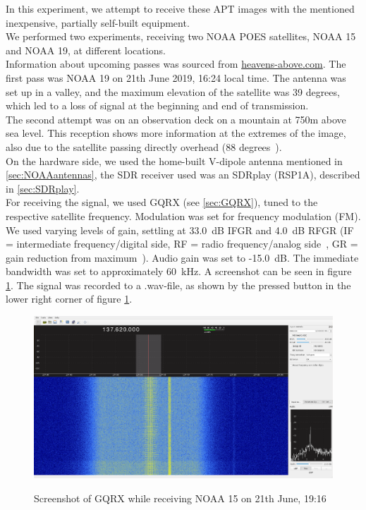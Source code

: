 \documentclass[conference]{IEEEtran}
\begin{document}
In this experiment, we attempt to receive these APT images with the mentioned inexpensive, partially self-built equipment.\\
We performed two experiments, receiving two NOAA POES satellites, NOAA 15 and NOAA 19, at different locations.\\
Information about upcoming passes was sourced from \url{heavens-above.com}. The first pass was NOAA 19 on 21th June 2019, 16:24 local time. The antenna was set up in a valley, and the maximum elevation of the satellite was 39 degrees, which led to a loss of signal at the beginning and end of transmission.\\
The second attempt was on an observation deck on a mountain at 750m above sea level. This reception shows more information at the extremes of the image, also due to the satellite passing directly overhead (88 degrees~\cite{heavensabove19noaa15}).\\
On the hardware side, we used the home-built V-dipole antenna mentioned in \ref{sec:NOAAantennas}, the SDR receiver used was an SDRplay (RSP1A), described in \ref{sec:SDRplay}.\\
For receiving the signal, we used GQRX (see \ref{sec:GQRX}), tuned to the respective satellite frequency. Modulation was set for frequency modulation (FM). We used varying levels of gain, settling at 33.0~dB IFGR and 4.0~dB RFGR (IF = intermediate frequency/digital side, RF = radio frequency/analog side~\cite{analog07rfif}, GR = gain reduction from maximum~\cite{github18gainreduction}). Audio gain was set to -15.0~dB. The immediate bandwidth was set to approximately 60~kHz. A screenshot can be seen in figure \ref{fig:gqrx_noaa15}. The signal was recorded to a .wav-file, as shown by the pressed button in the lower right corner of figure \ref{fig:gqrx_noaa15}.\\
\balance
\begin{figure}
	\centering
	\caption{Screenshot of GQRX while receiving NOAA 15 on 21th June, 19:16}
	\includegraphics[width=\textwidth]{gqrx_screenshot_noaa15} \label{fig:gqrx_noaa15}
\end{figure}
\end{document}
